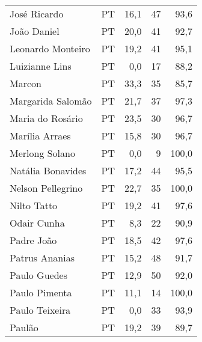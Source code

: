 \begin{longtable}{llrrr}
                        José Ricardo &             PT &      16,1 &           47 &       93,6 \\
                         João Daniel &             PT &      20,0 &           41 &       92,7 \\
                   Leonardo Monteiro &             PT &      19,2 &           41 &       95,1 \\
                      Luizianne Lins &             PT &       0,0 &           17 &       88,2 \\
                              Marcon &             PT &      33,3 &           35 &       85,7 \\
                   Margarida Salomão &             PT &      21,7 &           37 &       97,3 \\
                    Maria do Rosário &             PT &      23,5 &           30 &       96,7 \\
                      Marília Arraes &             PT &      15,8 &           30 &       96,7 \\
                      Merlong Solano &             PT &       0,0 &            9 &      100,0 \\
                   Natália Bonavides &             PT &      17,2 &           44 &       95,5 \\
                   Nelson Pellegrino &             PT &      22,7 &           35 &      100,0 \\
                         Nilto Tatto &             PT &      19,2 &           41 &       97,6 \\
                         Odair Cunha &             PT &       8,3 &           22 &       90,9 \\
                          Padre João &             PT &      18,5 &           42 &       97,6 \\
                      Patrus Ananias &             PT &      15,2 &           48 &       91,7 \\
                        Paulo Guedes &             PT &      12,9 &           50 &       92,0 \\
                       Paulo Pimenta &             PT &      11,1 &           14 &      100,0 \\
                      Paulo Teixeira &             PT &       0,0 &           33 &       93,9 \\
                              Paulão &             PT &      19,2 &           39 &       89,7 \\

\end{longtable}
